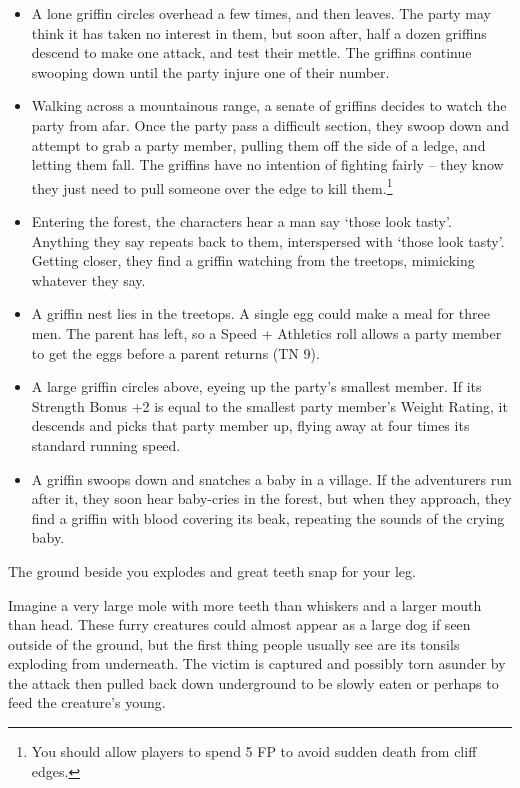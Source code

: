 \begin{multicols}{2}
\begin{itemize}
  \item{A lone griffin circles overhead a few times, and then leaves.
  The party may think it has taken no interest in them, but soon after, half a dozen griffins descend to make one attack, and test their mettle.
  The griffins continue swooping down until the party injure one of their number.}
  \item
  Walking across a mountainous range, a senate of griffins decides to watch the party from afar.
  Once the party pass a difficult section, they swoop down and attempt to grab a party member, pulling them off the side of a ledge, and letting them fall.
  The griffins have no intention of fighting fairly -- they know they just need to pull someone over the edge to kill them.\footnote{You should allow players to spend 5 FP to avoid sudden death from cliff edges.}
  \item
  Entering the forest, the characters hear a man say `those look tasty'.
  Anything they say repeats back to them, interspersed with `those look tasty'.
  Getting closer, they find a griffin watching from the treetops, mimicking whatever they say.
  \item{A griffin nest lies in the treetops.
  A single egg could make a meal for three men.
  The parent has left, so a Speed + Athletics roll allows a party member to get the eggs before a parent returns (TN 9).}
  \item{A large griffin circles above, eyeing up the party's smallest member.
  If its Strength Bonus +2 is equal to the smallest party member's Weight Rating, it descends and picks that party member up, flying away at four times its standard running speed.}
  \item
  A griffin swoops down and snatches a baby in a village.
  If the adventurers run after it, they soon hear baby-cries in the forest, but when they approach, they find a griffin with blood covering its beak, repeating the sounds of the crying baby.

\end{itemize}

\label{mouthdigger}

\begin{boxtext}

  The ground beside you explodes and great teeth snap for your leg.

\end{boxtext}

Imagine a very large mole with more teeth than whiskers and a larger mouth than head.
These furry creatures could almost appear as a large dog if seen outside of the ground, but the first thing people usually see are its tonsils exploding from underneath.
The victim is captured and possibly torn asunder by the attack then pulled back down underground to be slowly eaten or perhaps to feed the creature's young.


\end{multicols}
